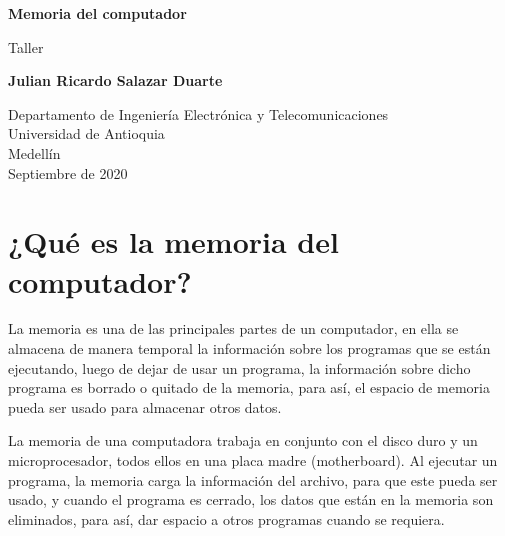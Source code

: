 \documentclass{article}
\begin{document}
\begin{titlepage}
    \begin{center}
        \vspace*{1cm}
            
        \Huge
        \textbf{Memoria del computador}
            
        \vspace{0.5cm}
        \LARGE
        Taller
            
        \vspace{1.5cm}
            
        \textbf{Julian Ricardo Salazar Duarte}
            
        \vfill
            
        \vspace{0.8cm}
            
        \Large
        Departamento de Ingeniería Electrónica y Telecomunicaciones\\
        Universidad de Antioquia\\
        Medellín\\
        Septiembre de 2020
            
    \end{center}
\end{titlepage}

\tableofcontents

\newpage

\section{¿Qué es la memoria del computador?}
La memoria es una de las principales partes de un computador, en ella se almacena de manera temporal la información sobre los programas que se están ejecutando, luego de dejar de usar un programa, la información sobre dicho programa es borrado o quitado de la memoria, para así, el espacio de memoria pueda ser usado para almacenar otros datos.
\vspace{0.5cm}

La memoria de una computadora trabaja en conjunto con el disco duro y un microprocesador, todos ellos en una placa madre (motherboard). Al ejecutar un programa, la memoria carga la información del archivo, para que este pueda ser usado, y cuando el programa es cerrado, los datos que están en la memoria son eliminados, para así, dar espacio a otros programas cuando se requiera.
\vspace{0.5cm}
\end{document}
